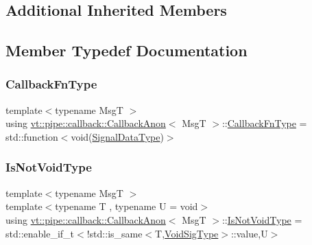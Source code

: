\subsection*{Additional Inherited Members}


\subsection{Member Typedef Documentation}
\mbox{\label{structvt_1_1pipe_1_1callback_1_1_callback_anon_a2532c5d78c1fb298d4a369aae7b45e85}} 
\subsubsection{\texorpdfstring{Callback\+Fn\+Type}{CallbackFnType}}
{\footnotesize\ttfamily template$<$typename MsgT $>$ \\
using \hyperlink{structvt_1_1pipe_1_1callback_1_1_callback_anon}{vt\+::pipe\+::callback\+::\+Callback\+Anon}$<$ MsgT $>$\+::\hyperlink{structvt_1_1pipe_1_1callback_1_1_callback_anon_a2532c5d78c1fb298d4a369aae7b45e85}{Callback\+Fn\+Type} =  std\+::function$<$void(\hyperlink{structvt_1_1pipe_1_1callback_1_1_callback_anon_ac503b95feb44bb0b60c1d69e1ed29074}{Signal\+Data\+Type})$>$}

\mbox{\label{structvt_1_1pipe_1_1callback_1_1_callback_anon_a91e58fe2f8165c826cecedde7e4535cf}} 
\subsubsection{\texorpdfstring{Is\+Not\+Void\+Type}{IsNotVoidType}}
{\footnotesize\ttfamily template$<$typename MsgT $>$ \\
template$<$typename T , typename U  = void$>$ \\
using \hyperlink{structvt_1_1pipe_1_1callback_1_1_callback_anon}{vt\+::pipe\+::callback\+::\+Callback\+Anon}$<$ MsgT $>$\+::\hyperlink{structvt_1_1pipe_1_1callback_1_1_callback_anon_a91e58fe2f8165c826cecedde7e4535cf}{Is\+Not\+Void\+Type} =  std\+::enable\+\_\+if\+\_\+t$<$!std\+::is\+\_\+same$<$T,\hyperlink{structvt_1_1pipe_1_1callback_1_1_callback_anon_a37f2e8be7b6c014a2a33232b678a05cc}{Void\+Sig\+Type}$>$\+::value,U$>$}

